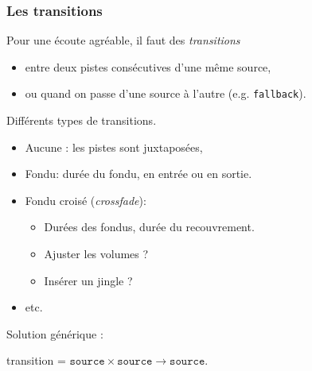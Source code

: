 \documentclass{beamer}
\begin{document}
\begin{frame}
  \frametitle{Les transitions}

  Pour une écoute agréable, il faut des \emph{transitions}
  \begin{itemize}
  \item entre deux pistes consécutives d'une même source,
  \item ou quand on passe d'une source à l'autre (e.g. \texttt{fallback}).
  \end{itemize}

  \bigskip

  Différents types de transitions.
  \begin{itemize}
  \item Aucune : les pistes sont juxtaposées,
  \item Fondu: durée du fondu, en entrée ou en sortie.
  \item Fondu croisé (\emph{crossfade}):
    \begin{itemize}
    \item Durées des fondus, durée du recouvrement.
    \item Ajuster les volumes ?
    \item Insérer un jingle ?
    \end{itemize}
  \item etc. %
  \end{itemize}

  \bigskip
  Solution générique :
  \begin{center}
    transition = $\mathtt{source} \times \mathtt{source} \rightarrow
    \mathtt{source}$.
  \end{center}
\end{frame}
\end{document}
